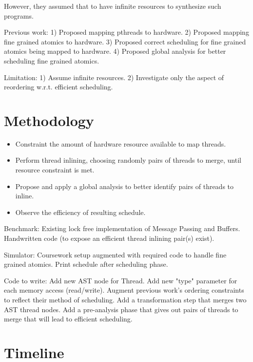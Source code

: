 \documentclass[sigplan,10pt,review]{acmart}
\begin{document}
        However, they assumed that to have infinite resources to synthesize such programs. 
        
        Previous work:
        1) Proposed mapping pthreads to hardware. 
        2) Proposed mapping fine grained atomics to hardware.
        3) Proposed correct scheduling for fine grained atomics being mapped to hardware. 
        4) Proposed global analysis for better scheduling fine grained atomics.

        Limitation:
        1) Assume infinite resources.
        2) Investigate only the aspect of reordering w.r.t. efficient scheduling. 

    \section{Methodology}

        \begin{itemize}
            \item Constraint the amount of hardware resource available to map threads. 
            \item Perform thread inlining, choosing randomly pairs of threads to merge, until resource constraint is met.
            \item Propose and apply a global analysis to better identify pairs of threads to inline.
            \item Observe the efficiency of resulting schedule.  
        \end{itemize}

        Benchmark:
        Existing lock free implementation of Message Passing and Buffers.
        Handwritten code (to expose an efficient thread inlining pair(s) exist).

        Simulator:
        Coursework setup augmented with required code to handle fine grained atomics. 
        Print schedule after scheduling phase. 

        Code to write:
        Add new AST node for Thread. 
        Add new "type" parameter for each memory access (read/write). 
        Augment previous work's ordering constraints to reflect their method of scheduling.
        Add a transformation step that merges two AST thread nodes. 
        Add a pre-analysis phase that gives out pairs of threads to merge that will lead to efficient scheduling.


    \section{Timeline}
\end{document}
